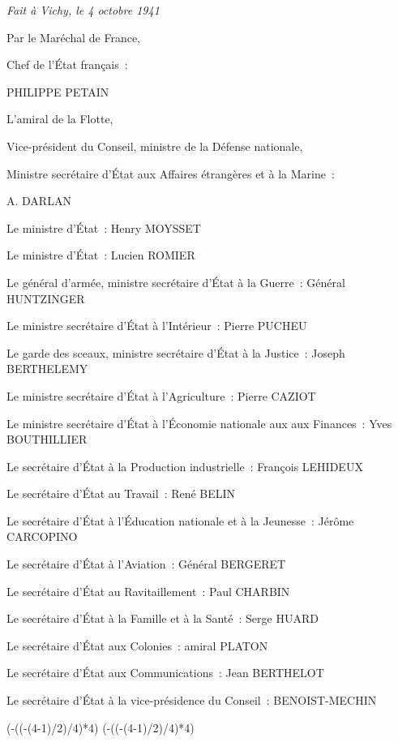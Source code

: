\documentclass[french,twoside]{book} %
\def\truncdiv#1#2{((#1-(#2-1)/2)/#2)}
\def\moduloop#1#2{(#1-\truncdiv{#1}{#2}*#2)}
\def\modulo#1#2{\number\numexpr\moduloop{#1}{#2}\relax}
\begin{document}
\noindent \emph{Fait à Vichy, le 4 octobre 1941}\par
Par le Maréchal de France,\par
Chef de l’État français :\par
PHILIPPE PETAIN\par
L’amiral de la Flotte,\par
Vice-président du Conseil, ministre de la Défense nationale,\par
Ministre secrétaire d’État aux Affaires étrangères et à la Marine :\par
A. DARLAN\par
Le ministre d’État : Henry MOYSSET\par
Le ministre d’État : Lucien ROMIER\par
Le général d’armée, ministre secrétaire d’État à la Guerre : Général HUNTZINGER\par
Le ministre secrétaire d’État à l’Intérieur : Pierre PUCHEU\par
Le garde des sceaux, ministre secrétaire d’État à la Justice : Joseph BERTHELEMY\par
Le ministre secrétaire d’État à l’Agriculture : Pierre CAZIOT\par
Le ministre secrétaire d’État à l’Économie nationale aux aux Finances : Yves BOUTHILLIER\par
Le secrétaire d’État à la Production industrielle : François LEHIDEUX\par
Le secrétaire d’État au Travail : René BELIN\par
Le secrétaire d’État à l’Éducation nationale et à la Jeunesse : Jérôme CARCOPINO\par
Le secrétaire d’État à l’Aviation : Général BERGERET\par
Le secrétaire d’État au Ravitaillement : Paul CHARBIN\par
Le secrétaire d’État à la Famille et à la Santé : Serge HUARD\par
Le secrétaire d’État aux Colonies : amiral PLATON\par
Le secrétaire d’État aux Communications : Jean BERTHELOT\par
Le secrétaire d’État à la vice-présidence du Conseil : BENOIST-MECHIN
 


\ifbooklet
  \pagestyle{empty}
  \clearpage
  \ifnum\modulo{\value{page}}{4}=0 \hbox{}\newpage\hbox{}\newpage\fi
  \ifnum\modulo{\value{page}}{4}=1 \hbox{}\newpage\hbox{}\newpage\fi
\end{document}
